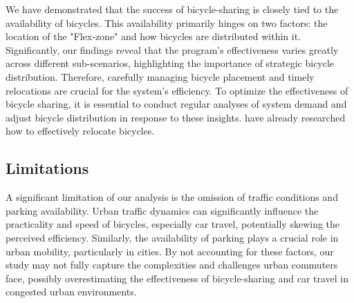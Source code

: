 We have demonstrated that the success of bicycle-sharing is closely tied to the availability of bicycles.
This availability primarily hinges on two factors: the location of the "Flex-zone" and how bicycles are distributed within it.
Significantly, our findings reveal that the program's effectiveness varies greatly across different sub-scenarios, highlighting the importance of strategic bicycle distribution.
Therefore, carefully managing bicycle placement and timely relocations are crucial for the system's efficiency.
To optimize the effectiveness of bicycle sharing, it is essential to conduct regular analyses of system demand and adjust bicycle distribution in response to these insights.
 have already researched how to effectively relocate bicycles.




\subsection{Limitations}
\label{sec:limitations}



A significant limitation of our analysis is the omission of traffic conditions and parking availability. 
Urban traffic dynamics can significantly influence the practicality and speed of bicycles, especially car travel, potentially skewing the perceived efficiency.
Similarly, the availability of parking plays a crucial role in urban mobility, particularly in cities.
By not accounting for these factors, our study may not fully capture the complexities and challenges urban commuters face, possibly overestimating the effectiveness of bicycle-sharing and car travel in congested urban environments.

